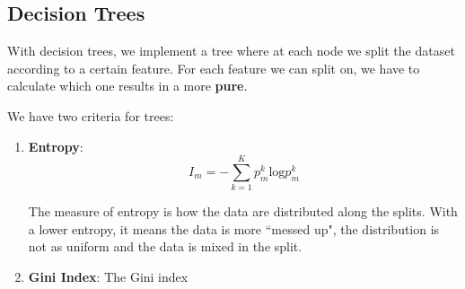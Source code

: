 \documentclass{tufte-handout}
\begin{document}
\subsection{Decision Trees}
With decision trees, we implement a tree where at each node we split the dataset according to a certain feature.
For each feature we can split on, we have to calculate which one results in a more \textbf{pure}.

We have two criteria for trees:
\begin{enumerate}
		\item \textbf{Entropy}:
				\[ I_{m} = -\sum_{k=1}^{K}p^{k}_{m}\textrm{log}p^{k}_{m}\]

				The measure of entropy is how the data are distributed along the splits.
				With a lower entropy, it means the data is more ``messed up", the distribution 
					is not as uniform and the data is mixed in the split.

		\item \textbf{Gini Index}:
				The Gini index

\end{enumerate}
	
\end{document}
